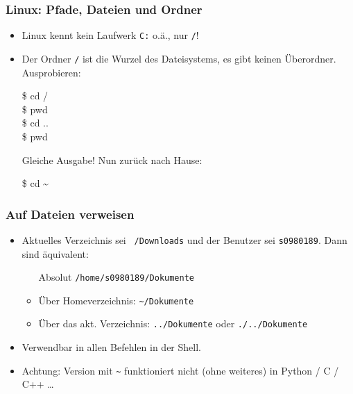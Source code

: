     \begin{frame}
        \frametitle{Linux: Pfade, Dateien und Ordner}
        \begin{itemize}
            \item Linux kennt kein Laufwerk \texttt{C:} o.ä., nur \texttt{/}!
            \item Der Ordner \texttt{/} ist die Wurzel des Dateisystems, es gibt
                keinen Überordner. Ausprobieren:
                \begin{tryit}
                    \$ cd / \\
                    \$ pwd \\
                    \$ cd .. \\
                    \$ pwd \\
                \end{tryit}
                \pause
                Gleiche Ausgabe! Nun zurück nach Hause:
                \begin{tryit}
                    \$ cd \textasciitilde
                \end{tryit}

        \end{itemize}
    \end{frame}

    \begin{frame}
        \frametitle{Auf Dateien verweisen}
        \begin{itemize}
            \item Aktuelles Verzeichnis sei \texttt{~/Downloads} und der
                Benutzer sei \texttt{s0980189}. Dann sind äquivalent:
                \begin{itemize}
                    \item[Absolut] \texttt{/home/s0980189/Dokumente}
                    \item Über Homeverzeichnis:
                        \texttt{\textasciitilde/Dokumente}
                    \item Über das akt. Verzeichnis: \texttt{../Dokumente} oder
                        \texttt{./../Dokumente}
                \end{itemize}
            \item Verwendbar in allen Befehlen in der Shell.
            \item \alert{Achtung: } Version mit \texttt{\textasciitilde}
                funktioniert nicht (ohne weiteres) in Python / C / C++ …
        \end{itemize}
    \end{frame}

